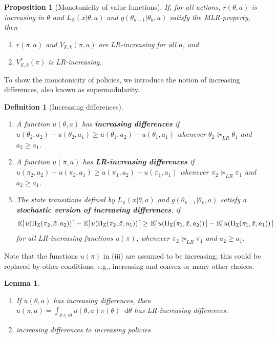 \documentclass[11pt,onecolumn]{article}
\theoremstyle{plain}
\newtheorem{lemma}{Lemma}[section]
\newtheorem{proposition}{Proposition}[section]
\newtheorem{definition}{Definition}
\newcommand{\ev}[1]{\hspace{+0.20ex}\mathbb{E}\hspace{-0.40ex}\left[ \, #1 \, \right]}
\newcommand{\iX}[0]{{\mathbb{X}}}
\newcommand\dif{\mathop{}\!\mathrm{d}}
\begin{document}
\begin{proposition}[Monotonicity of value functions]\label{prop:monotone_beliefs} If, for all actions, $r(\theta, a)$ is increasing in $\theta$ and $L_\iX(x|\theta,a)$ and $g(\theta_{k-1}|\theta_k,a)$ satisfy the MLR-property, then
\begin{enumerate}
    \item $r(\pi,a)$ and $V_{\iX,k}(\pi,a)$ are LR-increasing for all $a$, and
    \item $ V_{\iX,k}^*(\pi)$ is LR-increasing.
\end{enumerate}
\end{proposition}

\bigskip

To show the monotonicity of policies, we introduce the notion of increasing differences, also known as supermodularity.

\begin{definition}[Increasing differences]{\quad}
\begin{enumerate}
    \item A function $u(\theta,a)$ has \textbf{increasing differences} if $u(\theta_2,a_2)-u(\theta_2,a_1) \geq u(\theta_1,a_2)-u(\theta_1,a_1)$ whenever $\theta_2 \succeq_{LR} \theta_1$ and $a_2 \geq a_1$.
    \item A function $u(\pi,a)$ has \textbf{LR-increasing differences} if $u(\pi_2,a_2)-u(\pi_2,a_1) \geq u(\pi_1,a_2)-u(\pi_1,a_1)$ whenever $\pi_2 \succeq_{LR} \pi_1$ and $a_2 \geq a_1$.
    \item  The state transitions defined by $L_\iX(x|\theta,a)$ and $g(\theta_{k-1}|\theta_k,a)$ satisfy a \textbf{stochastic version of increasing differences}, if
    $$\ev{u(\Pi_\iX(\pi_2,\tilde{x},a_2))}-\ev{u(\Pi_\iX(\pi_2,\tilde{x},a_1))} \geq \ev{u(\Pi_\iX(\pi_1,\tilde{x},a_2))}-\ev{u(\Pi_\iX(\pi_1,\tilde{x},a_1))}$$
    for all LR-increasing functions $u(\pi)$, whenever $\pi_2 \succeq_{LR} \pi_1$ and $a_2 \geq a_1$.
\end{enumerate}
\end{definition}
\noindent Note that the functions $u(\pi)$ in (iii) are assumed to be increasing; this could be replaced by other conditions, e.g., increasing and convex or many other choices.
\begin{lemma}{\quad}
\begin{enumerate}
\item If $u(\theta,a)$ has increasing differences, then $u(\pi,a) = \int_{\theta \in \Theta} u(\theta,a) \pi(\theta) \dif \theta$ has LR-increasing differences.
    \item increasing differences to increasing policies
\end{enumerate}
\end{lemma}
\end{document}
